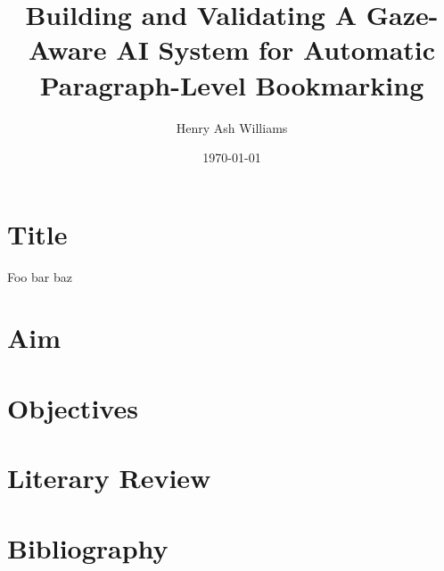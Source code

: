 \documentclass{article}
\title{Building and Validating A Gaze-Aware AI System for Automatic Paragraph-Level Bookmarking}
\author{Henry Ash Williams}
\date{\today}
\begin{document}
\maketitle

\section{Title}

Foo bar baz \cite{frisbe2022building}
\section{Aim}
\section{Objectives}
\section{Literary Review}
\section{Bibliography}

\printbibliography
\end{document}
